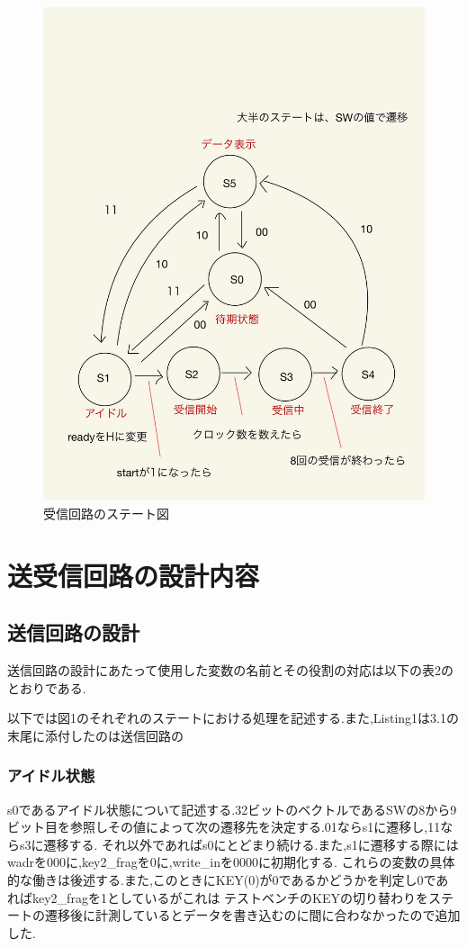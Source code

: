 \documentclass[dvipdfmx]{jarticle}
\begin{document}
\begin{figure}[h]
\begin{minipage}[b]{0.45\linewidth}
      \includegraphics[keepaspectratio, scale=0.1]{state_receive.jpg}
      \caption{受信回路のステート図}
    \end{minipage}
  \end{figure}
\section{送受信回路の設計内容}
\subsection{送信回路の設計}
送信回路の設計にあたって使用した変数の名前とその役割の対応は以下の表2のとおりである.


以下では図1のそれぞれのステートにおける処理を記述する.また,Listing1は3.1の末尾に添付したのは送信回路の
\subsubsection{アイドル状態}
s0であるアイドル状態について記述する.32ビットのベクトルであるSWの8から9ビット目を参照しその値によって次の遷移先を決定する.01ならs1に遷移し,11ならs3に遷移する.
それ以外であればs0にとどまり続ける.また,s1に遷移する際にはwadrを000に,key2\_fragを0に,write\_inを0000に初期化する.
これらの変数の具体的な働きは後述する.また,このときにKEY(0)が0であるかどうかを判定し0であればkey2\_fragを1としているがこれは
テストベンチのKEYの切り替わりをステートの遷移後に計測しているとデータを書き込むのに間に合わなかったので追加した.
\end{document}
